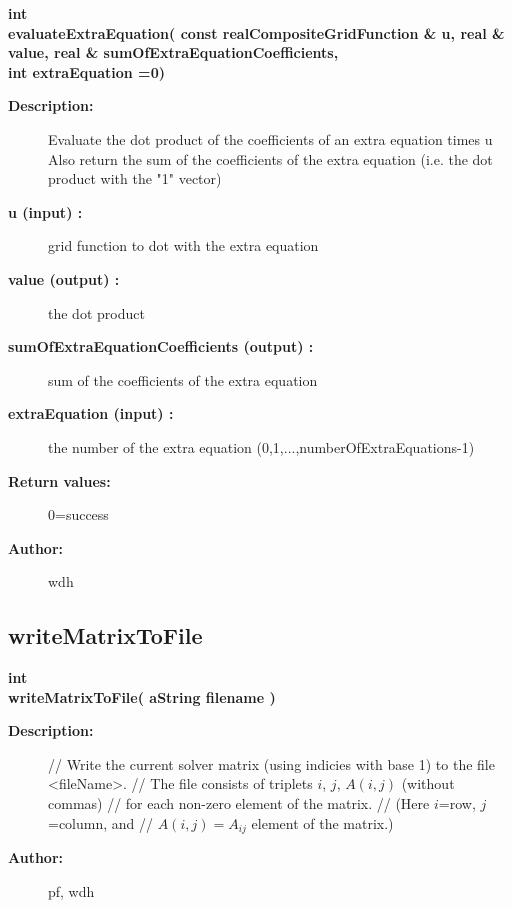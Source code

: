 \begin{flushleft} \textbf{%
int  \\ 
\settowidth{\OgesIncludeArgIndent}{evaluateExtraEquation(}%
evaluateExtraEquation( const realCompositeGridFunction \& u, real \& value, real \& sumOfExtraEquationCoefficients,\\ 
\hspace{\OgesIncludeArgIndent}int extraEquation  =0)
}\end{flushleft}
\begin{description}
\item[{\bf Description:}] 
    Evaluate the dot product of the coefficients of an extra equation times u 
  Also return the sum of the coefficients of the extra equation (i.e. the dot product with the "1" vector)

\item[{\bf u (input) :}]  grid function to dot with the extra equation
\item[{\bf value (output) :}]  the dot product
\item[{\bf sumOfExtraEquationCoefficients (output) :}]  sum of the coefficients of the extra equation
\item[{\bf extraEquation (input) :}]  the number of the extra equation (0,1,...,numberOfExtraEquations-1)
 
\item[{\bf Return values:}]  0=success
\item[{\bf Author:}]  wdh
\end{description}
\subsection{writeMatrixToFile}
 
\begin{flushleft} \textbf{%
int  \\ 
\settowidth{\OgesIncludeArgIndent}{writeMatrixToFile(}%
writeMatrixToFile( aString filename )
}\end{flushleft}
\begin{description}
\item[{\bf   Description:}]   
  //   Write the current solver matrix (using indicies with base 1) to the file <fileName>.
  //   The file consists of triplets $i$, $j$, $A(i,j)$ (without commas) 
  //   for each non-zero element of the matrix. 
  //   (Here $i$=row, $j$=column, and 
  //    $A(i,j)=A_{ij}$ element of the matrix.) 
\item[{\bf   Author:}]    pf, wdh
\end{description}
